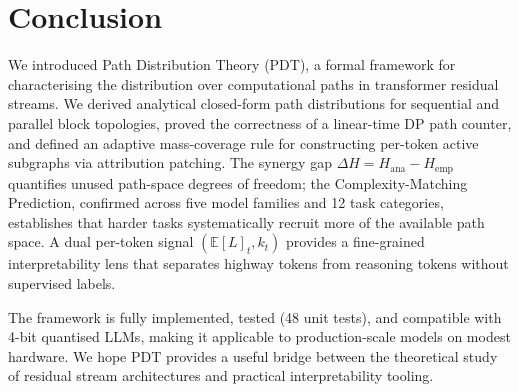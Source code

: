 \documentclass{article}
\newcommand{\E}{\mathbb{E}}
\newcommand{\Hana}{H_{\mathrm{ana}}}
\newcommand{\Hemp}{H_{\mathrm{emp}}}
\newcommand{\DeltaH}{\Delta H}
\begin{document}
\section{Conclusion}
\label{sec:conclusion}

We introduced Path Distribution Theory (PDT), a formal framework for characterising
the distribution over computational paths in transformer residual streams.
We derived analytical closed-form path distributions for sequential and parallel
block topologies, proved the correctness of a linear-time DP path counter, and
defined an adaptive mass-coverage rule for constructing per-token active subgraphs
via attribution patching.  The synergy gap $\DeltaH = \Hana - \Hemp$ quantifies
unused path-space degrees of freedom; the Complexity-Matching Prediction, confirmed
across five model families and 12 task categories, establishes that harder tasks
systematically recruit more of the available path space.  A dual per-token signal
$(\E[L]_t, k_t)$ provides a fine-grained interpretability lens that separates
highway tokens from reasoning tokens without supervised labels.

The framework is fully implemented, tested (48 unit tests), and compatible with
4-bit quantised LLMs, making it applicable to production-scale models on modest
hardware.  We hope PDT provides a useful bridge between the theoretical study of
residual stream architectures and practical interpretability tooling.

\end{document}
